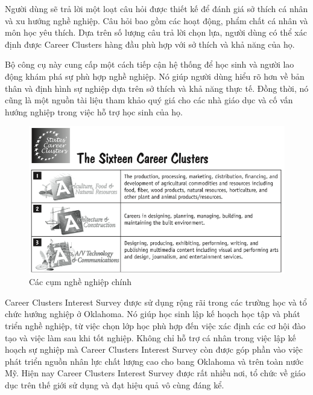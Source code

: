 Người dùng sẽ trả lời một loạt câu hỏi được thiết kế để đánh giá sở thích cá nhân và xu hướng nghề nghiệp. Câu hỏi bao gồm các hoạt động, phẩm chất cá nhân và môn học yêu thích. Dựa trên số lượng câu trả lời chọn lựa, người dùng có thể xác định được Career Clusters hàng đầu phù hợp với sở thích và khả năng của họ. 

Bộ công cụ này cung cấp một cách tiếp cận hệ thống để học sinh và người lao động khám phá sự phù hợp nghề nghiệp. Nó giúp người dùng hiểu rõ hơn về bản thân và định hình sự nghiệp dựa trên sở thích và khả năng thực tế. Đồng thời, nó cũng là một nguồn tài liệu tham khảo quý giá cho các nhà giáo dục và cố vấn hướng nghiệp trong việc hỗ trợ học sinh của họ.
\begin{figure}[H]
    \centering
    \includegraphics[width=0.5\linewidth]{images/CC.png}
    \vspace{0.6cm}
    \caption{Các cụm nghề nghiệp chính}
\end{figure}
Career Clusters Interest Survey được sử dụng rộng rãi trong các trường học và tổ chức hướng nghiệp ở Oklahoma. Nó giúp học sinh lập kế hoạch học tập và phát triển nghề nghiệp, từ việc chọn lớp học phù hợp đến việc xác định các cơ hội đào tạo và việc làm sau khi tốt nghiệp. Không chỉ hỗ trợ cá nhân trong việc lập kế hoạch sự nghiệp mà Career Clusters Interest Survey còn được  góp phần vào việc phát triển nguồn nhân lực chất lượng cao cho bang Oklahoma và trên toàn nước Mỹ. Hiện nay Career Clusters Interest Survey được rất nhiều nơi, tổ chức về giáo dục trên thế giới sử dụng và đạt hiệu quả vô cùng đáng kể. 

